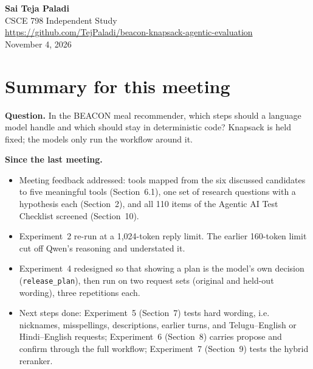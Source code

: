 \documentclass[11pt]{article}
\newcommand{\tool}[1]{\texttt{#1}}
\begin{document}
\begin{center}
{\bfseries Sai Teja Paladi}\\
CSCE 798 Independent Study\\
\url{https://github.com/TejPaladi/beacon-knapsack-agentic-evaluation}\\[6pt]
November 4, 2026
\end{center}

\section*{Summary for this meeting}

\textbf{Question.} In the BEACON meal recommender, which steps should a language
model handle and which should stay in deterministic code? Knapsack is held
fixed; the models only run the workflow around it.

\textbf{Since the last meeting.}
\begin{itemize}
  \item Meeting feedback addressed: tools mapped from the six discussed
        candidates to five meaningful tools (Section~6.1), one set of research
        questions with a hypothesis each (Section~2), and all 110 items of the
        Agentic AI Test Checklist screened (Section~10).
  \item Experiment~2 re-run at a 1,024-token reply limit. The earlier 160-token
        limit cut off Qwen's reasoning and understated it.
  \item Experiment~4 redesigned so that showing a plan is the model's own
        decision (\tool{release\_plan}), then run on two request sets (original
        and held-out wording), three repetitions each.
  \item Next steps done: Experiment~5 (Section~7) tests hard wording, i.e.
        nicknames, misspellings, descriptions, earlier turns, and
        Telugu--English or Hindi--English requests; Experiment~6 (Section~8)
        carries propose and confirm through the full workflow; Experiment~7
        (Section~9) tests the hybrid reranker.
\end{itemize}
\end{document}
